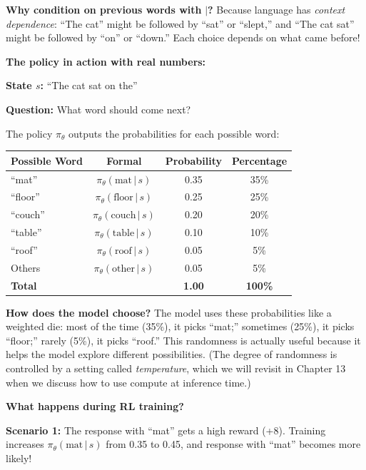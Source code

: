 \begin{chapterenv}
\begin{infobox}
\textbf{Why condition on previous words with} $|$\textbf{?} Because language has \textit{context dependence}: ``The cat'' might be followed by ``sat'' or ``slept,'' and ``The cat sat'' might be followed by ``on'' or ``down.'' Each choice depends on what came before!
\end{infobox}

\textbf{The policy in action with real numbers:}

\textbf{State $s$:} ``The cat sat on the''

\textbf{Question:} What word should come next?

The policy $\pi_\theta$ outputs the probabilities for each possible word:

\begin{center}
\begin{tabular}{lccc}
\toprule
\textbf{Possible Word} & \textbf{Formal} & \textbf{Probability} & \textbf{Percentage} \\
\midrule
``mat'' & $\pi_\theta(\text{mat} \,|\, s)$ & 0.35 & 35\% \\
``floor'' & $\pi_\theta(\text{floor} \,|\, s)$ & 0.25 & 25\% \\
``couch'' & $\pi_\theta(\text{couch} \,|\, s)$ & 0.20 & 20\% \\
``table'' & $\pi_\theta(\text{table} \,|\, s)$ & 0.10 & 10\% \\
``roof'' & $\pi_\theta(\text{roof} \,|\, s)$ & 0.05 & 5\% \\
Others & $\pi_\theta(\text{other} \,|\, s)$ & 0.05 & 5\% \\
\midrule
\textbf{Total} & & \textbf{1.00} & \textbf{100\%} \\
\bottomrule
\end{tabular}
\end{center}

\textbf{How does the model choose?} The model uses these probabilities like a weighted die: most of the time (35\%), it picks ``mat;'' sometimes (25\%), it picks ``floor;'' rarely (5\%), it picks ``roof.'' This randomness is actually useful because it helps the model explore different possibilities. (The degree of randomness is controlled by a setting called \textit{temperature}, which we will revisit in Chapter 13 when we discuss how to use compute at inference time.)

\textbf{What happens during RL training?}

\textbf{Scenario 1:} The response with ``mat'' gets a high reward (+8). Training increases $\pi_\theta(\text{mat} \,|\, s)$ from 0.35 to 0.45, and response with ``mat'' becomes more likely!


\end{chapterenv}
